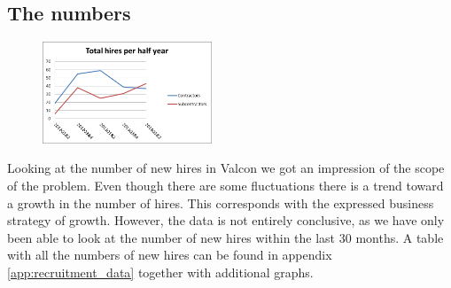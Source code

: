 \subsection{The numbers}
\begin{figure}
\vspace{-20pt}
\centering
\includegraphics[width=0.45\textwidth]{appendix/total_hires_per_half_year.png}
\label{fig:total_hires_per_half_year}
\end{figure}
Looking at the number of new hires in Valcon we got an impression of the scope of the problem.
Even though there are some fluctuations there is a trend toward a growth in the number of hires.
This corresponds with the expressed business strategy of growth.
However, the data is not entirely conclusive, as we have only been able to look at the number of new hires within the last 30 months.
A table with all the numbers of new hires can be found in appendix \ref{app:recruitment_data} together with additional graphs.

